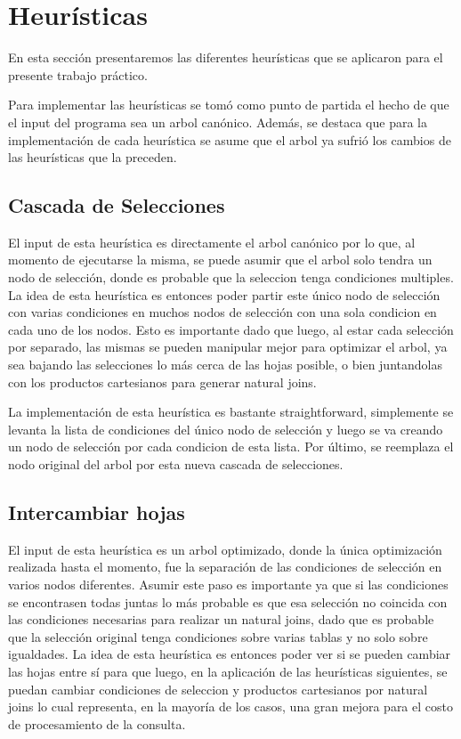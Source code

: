\documentclass[a4paper,11pt]{article}
\begin{document}



\tableofcontents

\newpage


\section{Heur\'isticas}

En esta secci\'on presentaremos las diferentes heur\'isticas que se aplicaron para el presente trabajo pr\'actico. 

Para implementar las heurísticas se tom\'o como punto de partida el hecho de que el input del programa sea un arbol can\'onico. Adem\'as, se destaca que para la implementaci\'on de cada heur\'istica se asume que el arbol ya sufri\'o los cambios de las heurísticas que la preceden.

\subsection{Cascada de Selecciones}

El input de esta heur\'istica es directamente el arbol can\'onico por lo que, al momento de ejecutarse la misma, se puede asumir que el arbol solo tendra un nodo de selecci\'on, donde es probable que la seleccion tenga condiciones multiples. La idea de esta heurística es entonces
poder partir este único nodo de selección con varias condiciones en muchos nodos de selección con una sola condicion en cada uno de los nodos. Esto es importante dado que luego, al estar cada selección por separado, las mismas se pueden manipular mejor para optimizar el arbol, ya sea bajando las selecciones lo
más cerca de las hojas posible, o bien juntandolas con los productos cartesianos para generar natural joins.

La implementación de esta heurística es bastante straightforward, simplemente se levanta la lista de condiciones del único nodo de selección y luego se va creando un nodo de selección por cada condicion de esta lista. Por último, se reemplaza el nodo original del arbol por esta nueva cascada de selecciones.


\subsection{Intercambiar hojas}

El input de esta heurística es un arbol optimizado, donde la única optimización realizada hasta el momento, fue la separación de las condiciones de selección en varios nodos diferentes. Asumir este paso es importante ya que si las condiciones se encontrasen todas juntas lo más probable es que esa selección no coincida con las condiciones necesarias para realizar un natural joins, dado que es probable que la selección original tenga condiciones sobre varias tablas y no solo sobre igualdades. La idea de esta heurística es entonces poder ver si se pueden cambiar las hojas entre sí para que luego, en la aplicación de las heurísticas siguientes, se puedan cambiar condiciones de seleccion y productos cartesianos por natural joins lo cual representa, en la mayoría de los casos, una gran mejora para el costo de procesamiento de la consulta.
\end{document}
